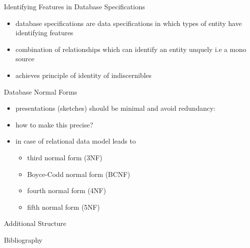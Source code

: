 \documentclass[xcolor=pst,dvips]{beamer}   %
\begin{document}
\begin{frame}{Identifying Features in Database Specifications}
\begin{itemize}
\item database specifications are data specifications in which types of entity have 
identifying features
\item combination of relationships which can identify an entity unquely
i.e a mono source
\item achieves principle of identity of indiscernibles
\end {itemize}
\end{frame}


\begin{frame}{Database Normal Forms}
\begin{itemize}
\item presentations (sketches) should be minimal and avoid redundancy:
\item how to make this precise?
\item in case of relational data model leads to 
   \begin{itemize}
     \item third normal form (3NF)
     \item Boyce-Codd normal form (BCNF)
     \item fourth normal form (4NF)
     \item fifth normal form (5NF)
   \end{itemize}
\end{itemize}
\end{frame}


\begin{frame}{Additional Structure}
\resizebox{11.3cm}{!}{

\featurelist
}
\end{frame}

\begin{frame}{Bibliography}

\end{frame}

\end{document}
